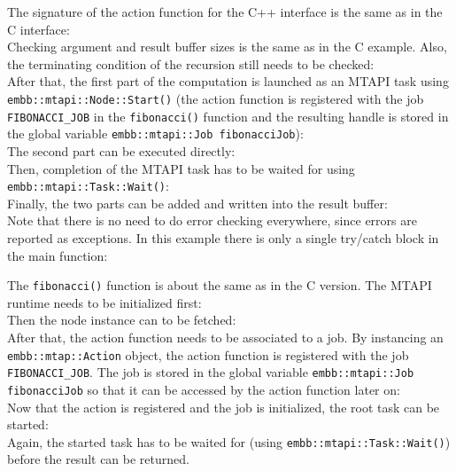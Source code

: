 The signature of the action function for the C++ interface is the same as in the C interface:
%
\\
%
Checking argument and result buffer sizes is the same as in the C example. Also, the terminating condition of the recursion still needs to be checked:
%
\\
%
After that, the first part of the computation is launched as an MTAPI task using \lstinline|embb::mtapi::Node::Start()| (the action function is registered with the job \lstinline|FIBONACCI_JOB| in the \lstinline|fibonacci()| function and the resulting handle is stored in the global variable \lstinline|embb::mtapi::Job fibonacciJob|):
%
\\
%
The second part can be executed directly:
%
\\
%
Then, completion of the MTAPI task has to be waited for using \lstinline|embb::mtapi::Task::Wait()|:
%
\\
%
Finally, the two parts can be added and written into the result buffer:
%
\\
% 
Note that there is no need to do error checking everywhere, since errors are reported as exceptions. In this example there is only a single try/catch block in the main function:
%
\\
%

The \lstinline|fibonacci()| function is about the same as in the C version. The MTAPI runtime needs to be initialized first:
%
\\
%
Then the node instance can to be fetched:
%
\\
%
After that, the action function needs to be associated to a job. By instancing an \lstinline|embb::mtap::Action| object, the action function is registered with the job \lstinline|FIBONACCI_JOB|. The job is stored in the global variable \lstinline|embb::mtapi::Job fibonacciJob| so that it can be accessed by the action function later on:
%
\\
%
Now that the action is registered and the job is initialized, the root task can be started:
%
\\
%
Again, the started task has to be waited for (using \lstinline|embb::mtapi::Task::Wait()|) before the result can be returned.

